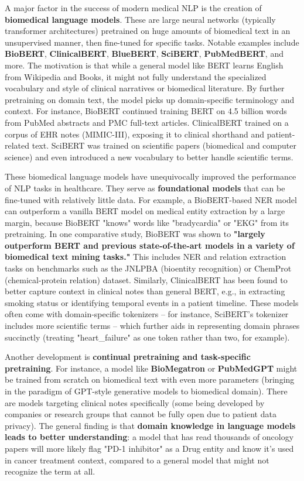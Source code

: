 A major factor in the success of modern medical NLP is the creation of \textbf{biomedical language models}. These are large neural networks (typically transformer architectures) pretrained on huge amounts of biomedical text in an unsupervised manner, then fine-tuned for specific tasks. Notable examples include \textbf{BioBERT}, \textbf{ClinicalBERT}, \textbf{BlueBERT}, \textbf{SciBERT}, \textbf{PubMedBERT}, and more. The motivation is that while a general model like BERT learns English from Wikipedia and Books, it might not fully understand the specialized vocabulary and style of clinical narratives or biomedical literature. By further pretraining on domain text, the model picks up domain-specific terminology and context. For instance, BioBERT continued training BERT on 4.5 billion words from PubMed abstracts and PMC full-text articles. ClinicalBERT \cite{Alsentzer2019} trained on a corpus of EHR notes (MIMIC-III), exposing it to clinical shorthand and patient-related text. SciBERT was trained on scientific papers (biomedical and computer science) and even introduced a new vocabulary to better handle scientific terms.

These biomedical language models have unequivocally improved the performance of NLP tasks in healthcare. They serve as \textbf{foundational models} that can be fine-tuned with relatively little data. For example, a BioBERT-based NER model can outperform a vanilla BERT model on medical entity extraction by a large margin, because BioBERT "knows" words like "bradycardia" or "EKG" from its pretraining. In one comparative study, BioBERT was shown to \textbf{"largely outperform BERT and previous state-of-the-art models in a variety of biomedical text mining tasks."} This includes NER and relation extraction tasks on benchmarks such as the JNLPBA (bioentity recognition) or ChemProt (chemical-protein relation) dataset. Similarly, ClinicalBERT has been found to better capture context in clinical notes than general BERT, e.g., in extracting smoking status or identifying temporal events in a patient timeline. These models often come with domain-specific tokenizers – for instance, SciBERT's tokenizer includes more scientific terms – which further aids in representing domain phrases succinctly (treating "heart\_failure" as one token rather than two, for example).

Another development is \textbf{continual pretraining and task-specific pretraining}. For instance, a model like \textbf{BioMegatron} or \textbf{PubMedGPT} might be trained from scratch on biomedical text with even more parameters (bringing in the paradigm of GPT-style generative models to biomedical domain). There are models targeting clinical notes specifically (some being developed by companies or research groups that cannot be fully open due to patient data privacy). The general finding is that \textbf{domain knowledge in language models leads to better understanding}: a model that has read thousands of oncology papers will more likely flag "PD-1 inhibitor" as a Drug entity and know it's used in cancer treatment context, compared to a general model that might not recognize the term at all.


